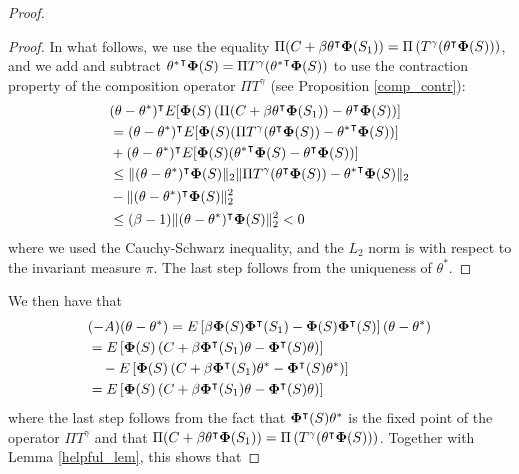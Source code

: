 \documentclass[11pt]{article}
\begin{document}
\begin{proof}
\begin{proof}
In what follows, we use the equality $\Pi(C+\beta \theta^\intercal{\bf \Phi}(S_1) ) = \Pi\left( T^\gamma ( \theta^\intercal{\bf \Phi}(S) ) \right)$, and we add and subtract ${\theta^*}^\intercal{\bf \Phi}(S) =\Pi T^\gamma({\theta^*}^\intercal{\bf \Phi}(S)  )$ to use the contraction property of the composition operator $\Pi T^\gamma$ (see Proposition \ref{comp_contr}):
\begin{align*}
& (\theta-\theta^*)^\intercal E[ {\bf \Phi}(S)\left(  \Pi(C+\beta \theta^\intercal{\bf \Phi}(S_1) )-\theta^\intercal{\bf \Phi}(S) \right)] \\
&= (\theta-\theta^*)^\intercal E[ {\bf \Phi}(S) (\Pi T^\gamma(\theta^\intercal{\bf \Phi}(S))-  {\theta^*}^\intercal{\bf \Phi}(S)  ) ]\\
& +  (\theta-\theta^*)^\intercal E[ {\bf \Phi}(S) ( {\theta^*}^\intercal{\bf \Phi}(S) -  \theta^\intercal{\bf \Phi}(S)  )]\\
&\leq  \| (\theta-\theta^*)^\intercal  {\bf \Phi}(S)\|_2 \| \Pi T^\gamma(\theta^\intercal{\bf \Phi}(S))-  {\theta^*}^\intercal{\bf \Phi}(S)\|_2\\
& - \| (\theta-\theta^*)^\intercal  {\bf \Phi}(S)\|^2_2\\
& \leq  (\beta-1) \| (\theta-\theta^*)^\intercal  {\bf \Phi}(S)\|^2_2 <0
\end{align*}
where we used the Cauchy-Schwarz inequality, and the $L_2$ norm is with respect to the invariant measure $\pi$. The last step follows from the uniqueness of $\theta^*$.
\end{proof}
We then have that
 \begin{align*}
 &(-A) (\theta-\theta^*)=E\left[\beta {\bf \Phi}(S){\bf \Phi}^\intercal(S_{1})- {\bf \Phi}(S){\bf \Phi}^\intercal(S)  \right] (\theta-\theta^*)\\
 &= E\left[{\bf \Phi}(S)\left( C+\beta {\bf \Phi}^\intercal(S_{1})\theta- {\bf \Phi}^\intercal(S)\theta \right) \right]\\
 & \quad - E\left[{\bf \Phi}(S)\left( C+\beta {\bf \Phi}^\intercal(S_{1})\theta^*- {\bf \Phi}^\intercal(S)\theta^* \right) \right]\\
 &=E\left[{\bf \Phi}(S)\left( C+\beta {\bf \Phi}^\intercal(S_{1})\theta- {\bf \Phi}^\intercal(S)\theta \right) \right]
 \end{align*}
 where the last step follows from the fact that ${\bf \Phi}^\intercal(S)\theta^*$ is the fixed point of the operator $\Pi T^\gamma$ and that $\Pi(C+\beta \theta^\intercal{\bf \Phi}(S_1) ) = \Pi\left( T^\gamma ( \theta^\intercal{\bf \Phi}(S) ) \right)$.  Together with Lemma \ref{helpful_lem}, this shows that 

\end{proof}
\end{document}

